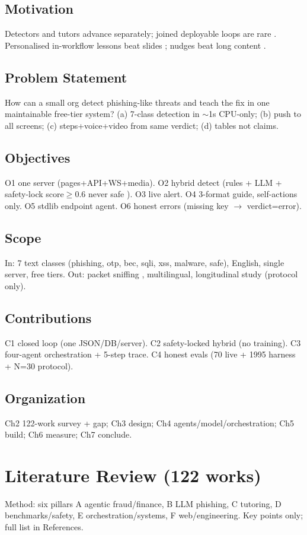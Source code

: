 \documentclass[11pt,a4paper]{article}
\begin{document}
\subsection{Motivation}
Detectors \cite{Heiding24,Koide24,Desolda24,UserRAG26} and tutors \cite{SchoniCHI25,Sriganthan25,TrainShield25} advance separately; joined deployable loops are rare \cite{SAGE26,FraudR125}. Personalised in-workflow lessons beat slides \cite{SchoniCHI25,TrainShield25,Pardos24}; nudges beat long content \cite{Lain24}.
\subsection{Problem Statement}
How can a small org detect phishing-like threats and teach the fix in one maintainable free-tier system? (a) 7-class detection in $\sim$1s CPU-only; (b) push to all screens; (c) steps+voice+video from same verdict; (d) tables not claims.
\subsection{Objectives}
O1 one server (pages+API+WS+media). O2 hybrid detect (rules + LLM + safety-lock score$\ge$0.6 never safe \cite{Hasan25,StruQ24}). O3 live alert. O4 3-format guide, self-actions only. O5 stdlib endpoint agent. O6 honest errors (missing key $\rightarrow$ verdict=error).
\subsection{Scope}
In: 7 text classes (phishing, otp, bec, sqli, xss, malware, safe), English, single server, free tiers. Out: packet sniffing \cite{Rigaki24,Castro25}, multilingual, longitudinal study (protocol only).
\subsection{Contributions}
C1 closed loop (one JSON/DB/server). C2 safety-locked hybrid (no training). C3 four-agent orchestration + 5-step trace. C4 honest evals (70 live + 1995 harness + N=30 protocol).
\subsection{Organization}
Ch2 122-work survey + gap; Ch3 design; Ch4 agents/model/orchestration; Ch5 build; Ch6 measure; Ch7 conclude.
\section{Literature Review (122 works)}
Method: six pillars A agentic fraud/finance, B LLM phishing, C tutoring, D benchmarks/safety, E orchestration/systems, F web/engineering. Key points only; full list in References.
\end{document}
